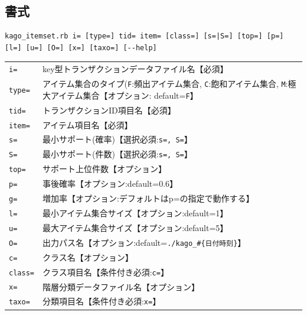 \documentclass[a4paper]{jarticle}
\begin{document}
\subsection*{書式}
\begin{verbatim}
kago_itemset.rb i= [type=] tid= item= [class=] [s=|S=] [top=] [p=] [l=] [u=] [O=] [x=] [taxo=] [--help]
\end{verbatim}

\begin{table}[htbp]
{\small
\begin{tabular}{ll}
\verb|i=|    & key型トランザクションデータファイル名【必須】 \\
\verb|type=| & アイテム集合のタイプ(\verb|F|:頻出アイテム集合, \verb|C|:飽和アイテム集合, \verb|M|:極大アイテム集合【オプション: default=\verb|F|】\\
\verb|tid=|  & トランザクションID項目名【必須】\\
\verb|item=| & アイテム項目名【必須】 \\
\verb|s=|    & 最小サポート(確率)【選択必須:\verb|s=, S=|】\\
\verb|S=|    & 最小サポート(件数)【選択必須:\verb|s=, S=|】\\
\verb|top=|  & サポート上位件数【オプション】\\
\verb|p=|    & 事後確率【オプション:default=0.6】\\
\verb|g=|    & 増加率【オプション:デフォルトはp=の指定で動作する】\\
\verb|l=|    & 最小アイテム集合サイズ【オプション:default=1】\\
\verb|u=|    & 最大アイテム集合サイズ【オプション:default=5】\\
\verb|O=|    & 出力パス名【オプション:default=\verb|./kago_#{日付時刻}|】\\
\verb|c=|    & クラス名【オプション】 \\
\verb|class=|& クラス項目名【条件付き必須:\verb|c=|】 \\
\verb|x=|    & 階層分類データファイル名【オプション】\\
\verb|taxo=| & 分類項目名【条件付き必須:\verb|x=|】\\

\end{tabular} 
}
\end{table} 
\end{document}

